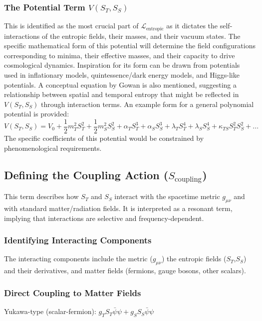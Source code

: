 \documentclass[11pt,a4paper]{article} %
\newcommand{\ST}{S_T}
\newcommand{\SSp}{S_S} %
\newcommand{\Scoupling}{S_{\text{coupling}}}
\begin{document}
\subsubsection{The Potential Term $V(\ST,\SSp)$}
\label{app:A.1.2}
This is identified as the most crucial part of $\mathcal{L}_{\text{entropic}}$ as it dictates the self-interactions of the entropic fields, their masses, and their vacuum states. The specific mathematical form of this potential will determine the field configurations corresponding to minima, their effective masses, and their capacity to drive cosmological dynamics. Inspiration for its form can be drawn from potentials used in inflationary models, quintessence/dark energy models, and Higgs-like potentials. A conceptual equation by Gowan is also mentioned, suggesting a relationship between spatial and temporal entropy that might be reflected in $V(\ST,\SSp)$ through interaction terms. An example form for a general polynomial potential is provided:
\begin{equation*}
V(\ST,\SSp)=V_0+\frac{1}{2}m_T^2\ST^2+\frac{1}{2}m_S^2\SSp^2+\alpha_T\ST^3+\alpha_S\SSp^3+\lambda_T\ST^4+\lambda_S\SSp^4+\kappa_{TS}\ST^2\SSp^2+...
\end{equation*}
The specific coefficients of this potential would be constrained by phenomenological requirements.

\subsection{Defining the Coupling Action ($\Scoupling$)}
\label{app:A.2}
This term describes how $\ST$ and $\SSp$ interact with the spacetime metric $g_{\mu\nu}$ and with standard matter/radiation fields. It is interpreted as a resonant term, implying that interactions are selective and frequency-dependent.

\subsubsection{Identifying Interacting Components}
The interacting components include the metric ($g_{\mu\nu}$) the entropic fields ($\ST$,$\SSp$) and their derivatives, and matter fields (fermions, gauge bosons, other scalars).

\subsubsection{Direct Coupling to Matter Fields}
Yukawa-type (scalar-fermion): $g_T\ST\bar{\psi}\psi+g_S\SSp\bar{\psi}\psi$
\end{document}
